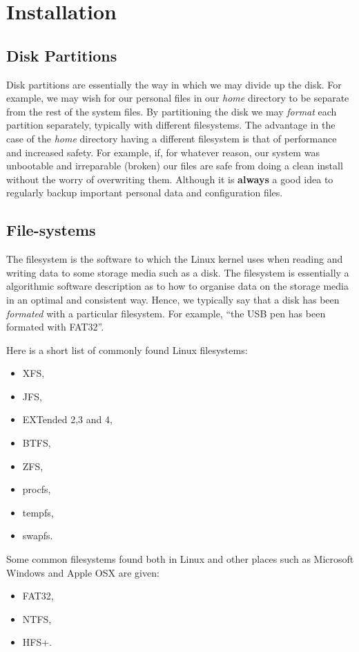 
\section{Installation} %
\label{sec:installation}

\subsection{Disk Partitions}

Disk partitions are essentially the way in which we may divide
up the disk. For example, we may wish for our personal files
in our \emph{home} directory to be separate from the rest of the
system files. By partitioning the disk we may \emph{format} each
partition separately, typically with different filesystems. The
advantage in the case of the \emph{home} directory having a different
filesystem is that of performance and increased safety. For example,
if, for whatever reason, our system was unbootable and irreparable
(broken) our files are safe from doing a clean install without the
worry of overwriting them. Although it is \textbf{always} a good
idea to regularly backup important personal data and configuration
files.

\subsection{File-systems}

The filesystem is the software to which the Linux kernel
uses when reading and writing data to some storage media
such as a disk. The filesystem is essentially a algorithmic
software description as to how to organise data on the storage
media in an optimal and consistent way. Hence, we typically say
that a disk has been \emph{formated} with a particular filesystem.
For example, ``the USB pen has been formated with FAT32''.

\begin{exmp}
	Here is a short list of commonly found Linux filesystems:
	\begin{itemize}
		\item XFS,
		\item JFS,
		\item EXTended 2,3 and 4,
		\item BTFS,
		\item ZFS,
		\item procfs,
		\item tempfs,
		\item swapfs.
	\end{itemize}
	Some common filesystems found both in Linux and other places
	such as Microsoft Windows and Apple OSX are given:
	\begin{itemize}
		\item FAT32,
		\item NTFS,
		\item HFS+.
	\end{itemize}
\end{exmp}

